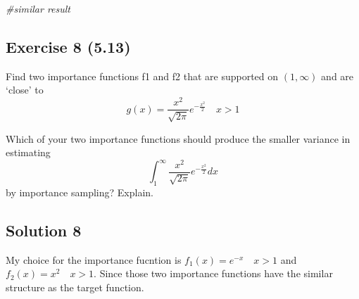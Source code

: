 \documentclass[
]{article}
\newenvironment{Shaded}{\begin{snugshade}}{\end{snugshade}}
\newcommand{\CommentTok}[1]{\textcolor[rgb]{0.56,0.35,0.01}{\textit{#1}}}
\begin{document}
\begin{Shaded}
\begin{Highlighting}[]
\CommentTok{#similar result}
\end{Highlighting}
\end{Shaded}

\hypertarget{exercise-8-5.13}{%
\subsection{Exercise 8 (5.13)}\label{exercise-8-5.13}}

Find two importance functions f1 and f2 that are supported on
\((1,\infty)\) and are `close' to
\[g(x) = \frac{x^2}{\sqrt{2\pi}} e^{-\frac{x^2}{2}} \quad x>1\]

Which of your two importance functions should produce the smaller
variance in estimating
\[\int_1^{\infty}\frac{x^2}{\sqrt{2\pi}} e^{-\frac{x^2}{2}} dx \] by
importance sampling? Explain.

\hypertarget{solution-8}{%
\subsection{Solution 8}\label{solution-8}}

My choice for the importance fucntion is \(f_1(x) = e^{-x} \quad x>1\)
and \(f_2(x) = {x^2}\quad x>1\). Since those two importance functions
have the similar structure as the target function.
\end{document}
